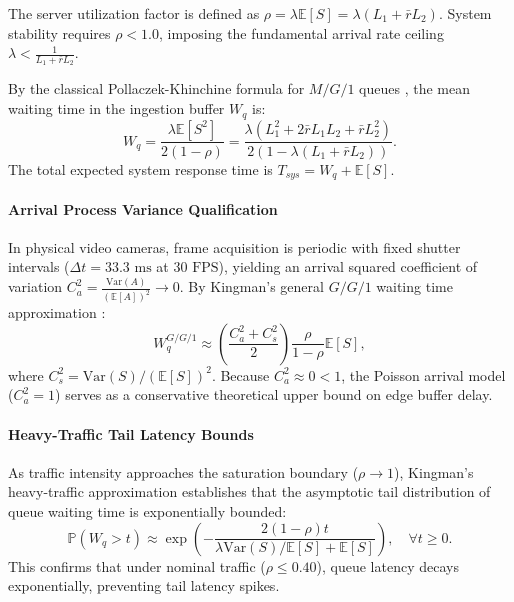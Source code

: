 \documentclass[conference]{IEEEtran}
\begin{document}
The server utilization factor is defined as $\rho = \lambda \mathbb{E}[S] = \lambda (L_1 + \bar{r} L_2)$. System stability requires $\rho < 1.0$, imposing the fundamental arrival rate ceiling $\lambda < \frac{1}{L_1 + \bar{r} L_2}$.

By the classical Pollaczek-Khinchine formula for $M/G/1$ queues \cite{kleinrock1975queueing}, the mean waiting time in the ingestion buffer $W_q$ is:
\begin{equation}
W_q = \frac{\lambda \mathbb{E}[S^2]}{2(1 - \rho)} = \frac{\lambda \left( L_1^2 + 2 \bar{r} L_1 L_2 + \bar{r} L_2^2 \right)}{2(1 - \lambda (L_1 + \bar{r} L_2))}.
\end{equation}
The total expected system response time is $T_{sys} = W_q + \mathbb{E}[S]$.

\paragraph{Arrival Process Variance Qualification} In physical video cameras, frame acquisition is periodic with fixed shutter intervals ($\Delta t = 33.3\text{ ms}$ at $30\text{ FPS}$), yielding an arrival squared coefficient of variation $C_a^2 = \frac{\mathrm{Var}(A)}{(\mathbb{E}[A])^2} \to 0$. By Kingman's general $G/G/1$ waiting time approximation \cite{kingman1961single}:
\begin{equation}
W_q^{G/G/1} \approx \left( \frac{C_a^2 + C_s^2}{2} \right) \frac{\rho}{1 - \rho} \mathbb{E}[S],
\end{equation}
where $C_s^2 = \mathrm{Var}(S) / (\mathbb{E}[S])^2$. Because $C_a^2 \approx 0 < 1$, the Poisson arrival model ($C_a^2 = 1$) serves as a conservative theoretical upper bound on edge buffer delay.

\paragraph{Heavy-Traffic Tail Latency Bounds} As traffic intensity approaches the saturation boundary ($\rho \to 1$), Kingman's heavy-traffic approximation \cite{kingman1961single} establishes that the asymptotic tail distribution of queue waiting time is exponentially bounded:
\begin{equation}
\mathbb{P}(W_q > t) \approx \exp\left( -\frac{2(1 - \rho) t}{\lambda \mathrm{Var}(S) / \mathbb{E}[S] + \mathbb{E}[S]} \right), \quad \forall t \ge 0.
\end{equation}
This confirms that under nominal traffic ($\rho \le 0.40$), queue latency decays exponentially, preventing tail latency spikes.
\end{document}
